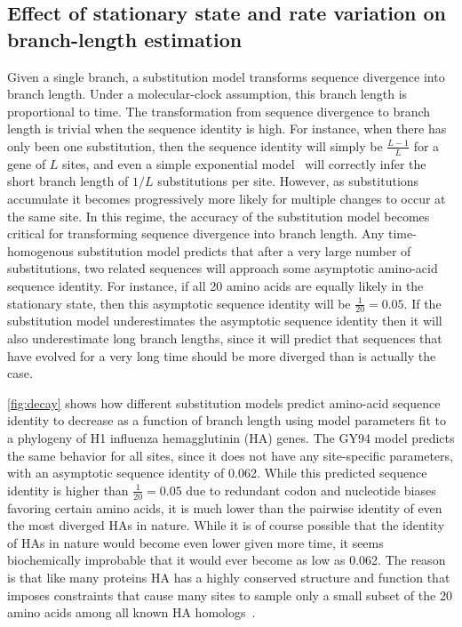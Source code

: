 \documentclass[11pt]{article}
\begin{document}
\subsection*{Effect of stationary state and rate variation on branch-length estimation}
Given a single branch, a substitution model transforms sequence divergence into branch length.
Under a molecular-clock assumption, this branch length is proportional to time.
The transformation from sequence divergence to branch length is trivial when the sequence identity is high.
For instance, when there has only been one substitution, then the sequence identity will simply be $\frac{L - 1}{L}$ for a gene of $L$ sites, and even a simple exponential model~\citep{zuckerkandl1965} will correctly infer the short branch length of $1/L$ substitutions per site.
However, as substitutions accumulate it becomes progressively more likely for multiple changes to occur at the same site.
In this regime, the accuracy of the substitution model becomes critical for transforming sequence divergence into branch length.
Any time-homogenous substitution model predicts that after a very large number of substitutions, two related sequences will approach some asymptotic amino-acid sequence identity.
For instance, if all 20 amino acids are equally likely in the stationary state, then this asymptotic sequence identity will be $\frac{1}{20} = 0.05$.
If the substitution model underestimates the asymptotic sequence identity then it will also underestimate long branch lengths, since it will predict that sequences that have evolved for a very long time should be more diverged than is actually the case.

\ref{fig:decay} shows how different substitution models predict amino-acid sequence identity to decrease as a function of branch length using model parameters fit to a phylogeny of H1 influenza hemagglutinin (HA) genes.
The GY94 model predicts the same behavior for all sites, since it does not have any site-specific parameters, with an asymptotic sequence identity of 0.062. 
While this predicted sequence identity is higher than $\frac{1}{20} = 0.05$ due to redundant codon and nucleotide biases favoring certain amino acids, it is much lower than the pairwise identity of even the most diverged HAs in nature.
While it is of course possible that the identity of HAs in nature would become even lower given more time, it seems biochemically improbable that it would ever become as low as 0.062. 
The reason is that like many proteins HA has a highly conserved structure and function that imposes constraints that cause many sites to sample only a small subset of the 20 amino acids among all known HA homologs~\citep{nobusawa1991comparison}.
\end{document}
